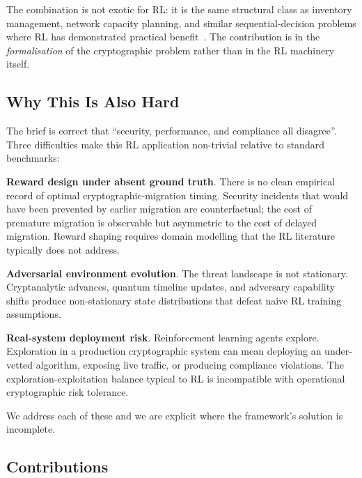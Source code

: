 \documentclass[sigconf,nonacm]{acmart}
\begin{document}
The combination is not exotic for RL: it is the same structural class
as inventory management, network capacity planning, and similar
sequential-decision problems where RL has demonstrated practical
benefit~\cite{sutton2018reinforcement,bertsekas2024dynamic}. The
contribution is in the \emph{formalisation} of the cryptographic
problem rather than in the RL machinery itself.

\subsection{Why This Is Also Hard}

The brief is correct that ``security, performance, and compliance
all disagree''. Three difficulties make this RL application
non-trivial relative to standard benchmarks:

\textbf{Reward design under absent ground truth}. There is no clean
empirical record of optimal cryptographic-migration timing. Security
incidents that would have been prevented by earlier migration are
counterfactual; the cost of premature migration is observable but
asymmetric to the cost of delayed migration. Reward shaping requires
domain modelling that the RL literature typically does not address.

\textbf{Adversarial environment evolution}. The threat landscape is
not stationary. Cryptanalytic advances, quantum timeline updates, and
adversary capability shifts produce non-stationary state distributions
that defeat naive RL training assumptions.

\textbf{Real-system deployment risk}. Reinforcement learning agents
explore. Exploration in a production cryptographic system can mean
deploying an under-vetted algorithm, exposing live traffic, or
producing compliance violations. The exploration-exploitation balance
typical to RL is incompatible with operational cryptographic risk
tolerance.

We address each of these and we are explicit where the framework's
solution is incomplete.

\subsection{Contributions}
\end{document}
